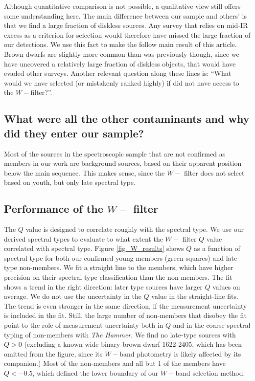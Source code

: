 Although quantitative comparison is not possible, a qualitative view still offers some understanding here.  The main difference between our sample and others' is that we find a large fraction of diskless sources.  Any survey that relies on mid-IR excess as a criterion for selection would therefore have missed the large fraction of our detections.  We use this fact to make the follow main result of this article.  Brown dwarfs are slightly more common than was previously though, since we have uncovered a relatively large fraction of diskless objects, that would have evaded other surveys.  Another relevant question along these lines is: ``What would we have selected (or mistakenly ranked highly) if did not have access to the  $W-$filter?''.


\subsection{What were all the other contaminants and why did they enter our sample?}
Most of the sources in the spectroscopic sample that are not confirmed as members in our work are background sources, based on their apparent position below the main sequence.  This makes sense, since the $W-$ filter does not select based on youth, but only late spectral type.

\subsection{Performance of the $W-$ filter}

The $Q$ value is designed to correlate roughly with the spectral type.  We use our derived spectral types to evaluate to what extent the $W-$ filter $Q$ value correlated with spectral type.  Figure \ref{fig_W_results} shows $Q$ as a function of spectral type for both our confirmed young members (green squares) and late-type non-members.  We fit a straight line to the members, which have higher precision on their spectral type classification than the non-members.  The fit shows a trend in the right direction: later type sources have larger $Q$ values on average.  We do not use the uncertainty in the $Q$ value in the straight-line fits.  The trend is even stronger in the same direction, if the measurement uncertainty is included in the fit.  Still, the large number of non-members that disobey the fit point to the role of measurement uncertainty both in $Q$ and in the coarse spectral typing of non-members with \emph{The Hammer}.  We find no late-type sources with $Q>0$ (excluding a known wide binary brown dwarf 1622-2405, which has been omitted from the figure, since its $W-$band photometry is likely affected by its companion.)  Most of the non-members and all but 1 of the members have $Q<-0.5$, which defined the lower boundary of our $W-$band selection method.  

